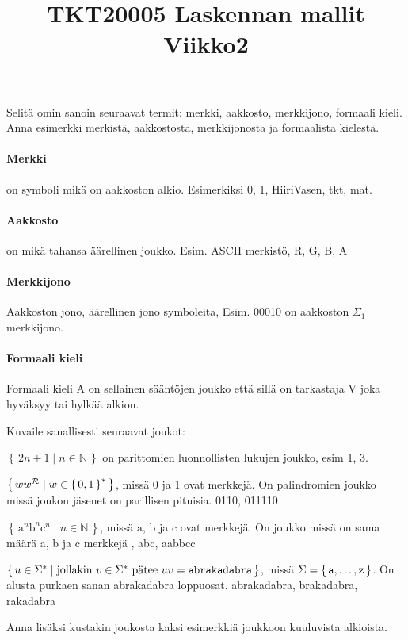 \documentclass[12pt,a4paper]{article}
\title{TKT20005 Laskennan mallit Viikko2}
\date{}
\newcommand{\set}[1]{\left\{\,#1\,\right\}}
\newcommand{\N}{\mathbb{N}}
\newcommand{\rma}{\mathrm{a}}
\newcommand{\rmb}{\mathrm{b}}
\newcommand{\rmc}{\mathrm{c}}
\begin{document}
\maketitle

Selitä omin sanoin seuraavat termit: merkki, aakkosto, merkkijono, formaali kieli. Anna esimerkki merkistä, aakkostosta, merkkijonosta ja formaalista kielestä.

\paragraph{Merkki} on symboli mikä on aakkoston alkio. Esimerkiksi 0, 1, HiiriVasen, tkt, mat.
\paragraph{Aakkosto} on mikä tahansa äärellinen joukko. Esim. ASCII merkistö, {R, G, B, A}
\paragraph{Merkkijono} Aakkoston jono, äärellinen jono symboleita, Esim. 00010 on aakkoston $\Sigma_1$ merkkijono.
\paragraph{Formaali kieli} Formaali kieli A on sellainen sääntöjen joukko että sillä on tarkastaja V joka hyväksyy tai hylkää alkion.



Kuvaile sanallisesti seuraavat joukot:
\begin{kohta}
\item $\set{2n+1\mid n\in\N}$ on parittomien luonnollisten lukujen joukko, esim 1, 3.
\item $\set{ww^{\cal R}\mid w\in\set{0,1}^\ast}$, missä 0 ja 1 ovat merkkejä. On palindromien joukko missä joukon jäsenet on parillisen pituisia. 0110, 011110
\item $\set{\rma^n\rmb^n\rmc^n\mid n\in\N}$, missä $\rma$, $\rmb$ ja $\rmc$ ovat merkkejä. On joukko missä on sama määrä a, b ja c merkkejä \epsilon, abc, aabbcc
\item $\set{u\in\Sigma^\ast\mid
\mbox{jollakin $v\in\Sigma^\ast$ pätee $uv=\mbox{\tt abrakadabra}$}}$,
missä $\Sigma=\set{\mbox{\tt a},\ldots,\mbox{\tt z}}$. On alusta purkaen sanan abrakadabra loppuosat. abrakadabra, brakadabra, rakadabra
\end{kohta}
Anna lisäksi kustakin joukosta kaksi esimerkkiä joukkoon kuuluvista
alkioista.
\end{document}
